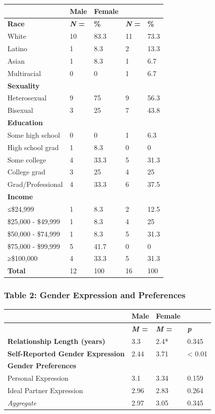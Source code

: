 \documentclass[twoside]{report}
\begin{document}
\begin{longtable}[]{@{}lllll@{}}
\toprule
& \textbf{Male} & \textbf{Female} & &\tabularnewline
\midrule
\endhead
\textbf{Race} & \textbf{\emph{N} =} & \textbf{\%} & \textbf{\emph{N} =}
& \textbf{\%}\tabularnewline
White & 10 & 83.3 & 11 & 73.3\tabularnewline
Latino & 1 & 8.3 & 2 & 13.3\tabularnewline
Asian & 1 & 8.3 & 1 & 6.7\tabularnewline
Multiracial & 0 & 0 & 1 & 6.7\tabularnewline
\textbf{Sexuality} & & & &\tabularnewline
Heterosexual & 9 & 75 & 9 & 56.3\tabularnewline
Bisexual & 3 & 25 & 7 & 43.8\tabularnewline
\textbf{Education} & & & &\tabularnewline
Some high school & 0 & 0 & 1 & 6.3\tabularnewline
High school grad & 1 & 8.3 & 0 & 0\tabularnewline
Some college & 4 & 33.3 & 5 & 31.3\tabularnewline
College grad & 3 & 25 & 4 & 25\tabularnewline
Grad/Professional & 4 & 33.3 & 6 & 37.5\tabularnewline
\textbf{Income} & & & &\tabularnewline
≤\$24,999 & 1 & 8.3 & 2 & 12.5\tabularnewline
\$25,000 - \$49,999 & 1 & 8.3 & 4 & 25\tabularnewline
\$50,000 - \$74,999 & 1 & 8.3 & 5 & 31.3\tabularnewline
\$75,000 - \$99,999 & 5 & 41.7 & 0 & 0\tabularnewline
≥\$100,000 & 4 & 33.3 & 5 & 31.3\tabularnewline
\textbf{Total} & 12 & 100 & 16 & 100\tabularnewline
\bottomrule
\end{longtable}

\hypertarget{table-2}{\subsubsection[Table 2: Gender Expression \\and
Preferences]{Table 2: Gender Expression and
Preferences}}

\begin{longtable}[]{@{}llll@{}}
\toprule
& \textbf{Male} & \textbf{Female} &\tabularnewline
\midrule
\endhead
& \textbf{\emph{M} =} & \textbf{\emph{M} =~} &
\emph{\textbf{p}}\tabularnewline
\textbf{Relationship Length (years)} & 3.3 & 2.4* & 0.345\tabularnewline
\textbf{Self-Reported Gender Expression} & 2.44 & 3.71 & \textless{}
0.01\tabularnewline
\textbf{Gender Preferences} & & &\tabularnewline
Personal Expression & 3.1 & 3.34 & 0.159\tabularnewline
Ideal Partner Expression & 2.96 & 2.83 & 0.264\tabularnewline
\emph{Aggregate} & 2.97 & 3.05 & 0.345\tabularnewline
\bottomrule
\end{longtable}
\end{document}
